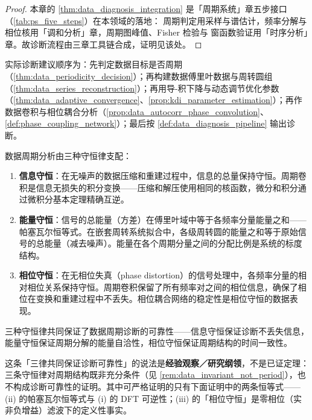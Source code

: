 \begin{proof}
本章的 \cref{thm:data_diagnosis_integration} 是「周期系统」章五步接口（\cref{tab:ps_five_steps}）在本领域的落地：
周期判定用采样与谱估计，频率分解与相位核用「调和分析」章，周期图峰值、Fisher 检验与
窗函数验证用「时序分析」章。故诊断流程由三章工具链合成，证明见该处。
\end{proof}

\begin{remark}[整合后的操作顺序]\label{rem:data_integration_order}
实际诊断建议顺序为：先判定数据目标是否周期（\cref{thm:data_periodicity_decision}）；再构建数据傅里叶数据与周转圆组（\cref{thm:data_series_reconstruction}）；再用导-积下降与动态调节优化参数（\cref{thm:data_adaptive_convergence}、\cref{prop:kdi_parameter_estimation}）；再作数据卷积与相位耦合分析（\cref{prop:data_autocorr_phase_convolution}、\cref{def:phase_coupling_network}）；最后按 \cref{def:data_diagnosis_pipeline} 输出诊断。
\end{remark}

\begin{remark}\label{thm:data_conservation}
数据周期分析由三种守恒律支配：
\begin{enumerate}[label=(\roman*)]
    \item \textbf{信息守恒}：在无噪声的数据压缩和重建过程中，信息的总量保持守恒。周期卷积是信息无损失的积分变换——压缩和解压使用相同的核函数，微分和积分通过微积分基本定理精确互逆。
    \item \textbf{能量守恒}：信号的总能量（方差）在傅里叶域中等于各频率分量能量之和——帕塞瓦尔恒等式。在嵌套周转系统拟合中，各级周转圆的能量之和等于原始信号的总能量（减去噪声）。能量在各个周期分量之间的分配比例是系统的标度结构。
    \item \textbf{相位守恒}：在无相位失真（phase distortion）的信号处理中，各频率分量的相对相位关系保持守恒。周期卷积保留了所有频率对之间的相位信息，确保了相位在变换和重建过程中不丢失。相位耦合网络的稳定性是相位守恒的数据表现。
\end{enumerate}
三种守恒律共同保证了数据周期诊断的可靠性——信息守恒保证诊断不丢失信息，能量守恒保证周期分解的能量自洽性，相位守恒保证周期结构的时间一致性。

这条「三律共同保证诊断可靠性」的说法是\textbf{经验观察／研究纲领}，不是已证定理：三条守恒律对周期结构既非充分条件（见 \cref{rem:data_invariant_not_period}），也不构成诊断可靠性的证明。其中可严格证明的只有下面证明中的两条恒等式——(ii) 的帕塞瓦尔恒等式与 (i) 的 DFT 可逆性；(iii) 的「相位守恒」是零相位（实非负增益）滤波下的定义性事实。
\end{remark}

